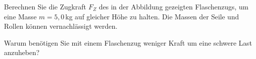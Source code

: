 \begin{ExerciseBlock}
Berechnen Sie die Zugkraft $F_Z$ des in der Abbildung gezeigten Flaschenzugs, um eine Masse $m = 5,0\,$kg auf gleicher Höhe zu halten. Die Massen der Seile und Rollen können vernachlässigt werden.
\begin{center}
\end{center}

Warum benötigen Sie mit einem Flaschenzug weniger Kraft um eine schwere Last anzuheben?
\end{ExerciseBlock}
